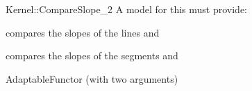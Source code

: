 \begin{ccRefFunctionObjectConcept}{Kernel::CompareSlope_2}
A model for this must provide:


      {compares the slopes of the lines  and }

      {compares the slopes of the segments  and }

\ccRefines
AdaptableFunctor (with two arguments)

\ccSeeAlso

 \\

\end{ccRefFunctionObjectConcept}
